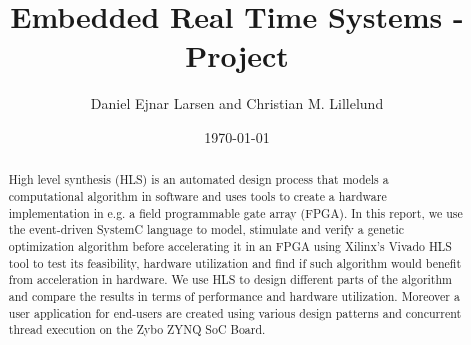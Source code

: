 \documentclass{article}
\title{Embedded Real Time Systems - Project}
\author{Daniel Ejnar Larsen and Christian M. Lillelund}
\date{\today}
\begin{document}
\maketitle
\begin{abstract}
High level synthesis (HLS) is an automated design process that models a computational algorithm in software and uses tools to create a hardware implementation in e.g. a field programmable gate array (FPGA). In this report, we use the event-driven SystemC language to model, stimulate and verify a genetic optimization algorithm before accelerating it in an FPGA using Xilinx's Vivado HLS tool to test its feasibility, hardware utilization and find if such algorithm would benefit from acceleration in hardware. We use HLS to design different parts of the algorithm and compare the results in terms of performance and hardware utilization. Moreover a user application for end-users are created using various design patterns and concurrent thread execution on the Zybo ZYNQ SoC Board. 
\end{abstract}






















\appendix

%
\end{document}
